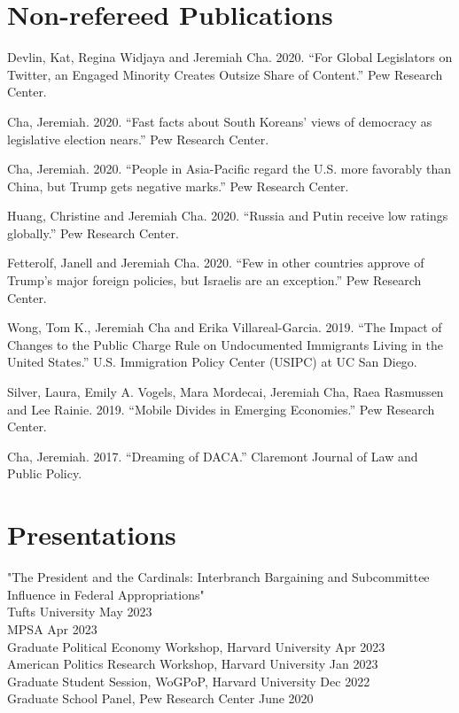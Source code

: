 \documentclass[margin, line]{res}
\begin{document}
\begin{resume}
\section{Non-refereed Publications}
\begin{etaremune}
	\item Devlin, Kat, Regina Widjaya and Jeremiah Cha. 2020. ``For Global Legislators on Twitter, an Engaged Minority Creates Outsize Share of Content.'' Pew Research Center.
	\item Cha, Jeremiah. 2020. ``Fast facts about South Koreans’ views of democracy as legislative election nears.'' Pew Research Center.
	\item Cha, Jeremiah. 2020. ``People in Asia-Pacific regard the U.S. more favorably than China, but Trump gets negative marks.'' Pew Research Center.
	\item Huang, Christine and Jeremiah Cha. 2020. ``Russia and Putin receive low ratings globally.'' Pew Research Center.
	\item Fetterolf, Janell and Jeremiah Cha. 2020. ``Few in other countries approve of Trump’s major foreign policies, but Israelis are an exception.'' Pew Research Center.
	\item Wong, Tom K., Jeremiah Cha and Erika Villareal-Garcia. 2019. ``The Impact of Changes to the Public Charge Rule on Undocumented Immigrants Living in the United States.'' U.S. Immigration Policy Center (USIPC) at UC San Diego.
	\item Silver, Laura, Emily A. Vogels, Mara Mordecai, Jeremiah Cha, Raea Rasmussen and Lee Rainie. 2019. ``Mobile Divides in Emerging Economies.'' Pew Research Center.
	\item Cha, Jeremiah. 2017. ``Dreaming of DACA.'' Claremont Journal of Law and Public Policy.
\end{etaremune}

\section{Presentations}
"The President and the Cardinals: Interbranch Bargaining and Subcommittee Influence in Federal Appropriations"\\
\hspace*{5mm} Tufts University \hfill May 2023\\
\hspace*{5mm} MPSA \hfill Apr 2023\\
\hspace*{5mm} Graduate Political Economy Workshop, Harvard University \hfill Apr 2023\\
\hspace*{5mm} American Politics Research Workshop, Harvard University \hfill Jan 2023\\
\hspace*{5mm} Graduate Student Session, WoGPoP, Harvard University \hfill Dec 2022\\
Graduate School Panel, Pew Research Center  \hfill June 2020


\end{resume}
\end{document}
